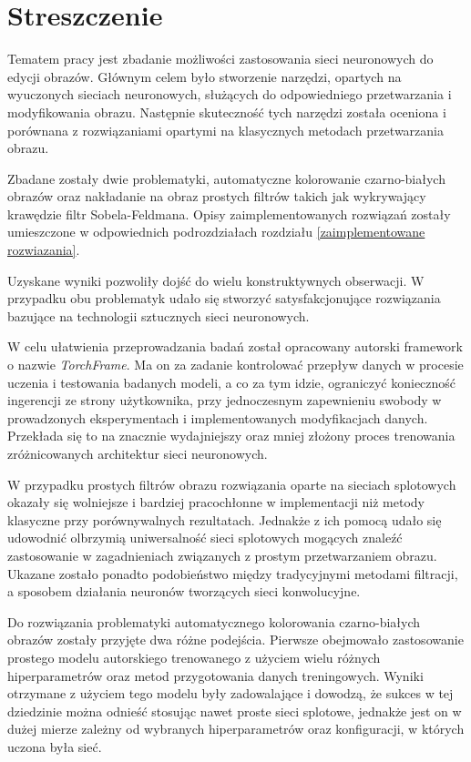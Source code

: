 \section*{Streszczenie}

  Tematem pracy jest zbadanie możliwości zastosowania sieci neuronowych do
  edycji obrazów. Głównym celem było stworzenie narzędzi, opartych na wyuczonych
  sieciach neuronowych, służących do odpowiedniego przetwarzania i
  modyfikowania obrazu. Następnie skuteczność tych narzędzi została oceniona i
  porównana z rozwiązaniami opartymi na klasycznych metodach przetwarzania obrazu.

  Zbadane zostały dwie problematyki, automatyczne kolorowanie czarno-białych obrazów
  oraz nakładanie na obraz prostych filtrów takich jak wykrywający
  krawędzie filtr Sobela-Feldmana. Opisy zaimplementowanych rozwiązań zostały
  umieszczone w odpowiednich podrozdziałach
  rozdziału \ref{zaimplementowane rozwiazania}.

  Uzyskane wyniki pozwoliły dojść do wielu konstruktywnych obserwacji. W przypadku obu
  problematyk udało się stworzyć satysfakcjonujące rozwiązania bazujące na
  technologii sztucznych sieci neuronowych.

  W celu ułatwienia przeprowadzania badań został opracowany autorski framework
  o nazwie \textit{TorchFrame}. Ma on za zadanie kontrolować
  przepływ danych w procesie uczenia i testowania badanych modeli, a co za tym
  idzie, ograniczyć konieczność ingerencji ze strony użytkownika, przy jednoczesnym
  zapewnieniu swobody w prowadzonych eksperymentach i implementowanych modyfikacjach danych. Przekłada
  się to na znacznie wydajniejszy oraz mniej złożony proces trenowania
  zróżnicowanych architektur sieci neuronowych.

  W przypadku prostych filtrów obrazu rozwiązania
  oparte na sieciach splotowych okazały się wolniejsze i bardziej pracochłonne w
  implementacji niż metody klasyczne przy porównywalnych rezultatach. Jednakże
  z ich pomocą udało się udowodnić olbrzymią uniwersalność sieci splotowych
  mogących znaleźć zastosowanie w zagadnieniach związanych z prostym
  przetwarzaniem obrazu. Ukazane zostało ponadto podobieństwo między tradycyjnymi
  metodami filtracji, a sposobem działania neuronów tworzących sieci konwolucyjne.

  Do rozwiązania problematyki automatycznego kolorowania czarno-białych
  obrazów zostały przyjęte dwa różne podejścia. Pierwsze obejmowało
  zastosowanie prostego modelu autorskiego trenowanego z użyciem wielu różnych
  hiperparametrów oraz metod przygotowania danych treningowych.
  Wyniki otrzymane z użyciem tego modelu były zadowalające i dowodzą, że
  sukces w tej dziedzinie można odnieść stosując nawet proste sieci splotowe,
  jednakże jest on w dużej mierze zależny od wybranych hiperparametrów oraz
  konfiguracji, w których uczona była sieć.

